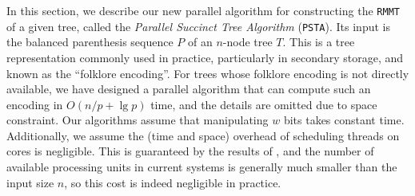 In this section, we describe our new parallel algorithm for constructing
the {\tt RMMT} of a given tree, called the \emph{Parallel Succinct Tree
  Algorithm} ({\tt PSTA}).
Its input is the balanced parenthesis sequence $P$ of an $n$-node
tree $T$.
This is a tree representation commonly used in practice, particularly in
secondary storage, and known as the ``folklore encoding''.
For trees whose folklore encoding is not directly available,
we have designed a parallel algorithm that
can compute such an encoding in $O(n/p + \lg p)$ time, and the
details are omitted due to space constraint.
Our algorithms assume that manipulating $w$ bits takes constant time.
Additionally, we assume the (time and space) overhead
of scheduling threads on cores is negligible. This is
guaranteed by the results of \cite{Blumofe:1999:SMC:324133.324234},
and the number of available processing units in current
systems is generally much smaller than the input size $n$, so this
cost is indeed negligible in practice.

